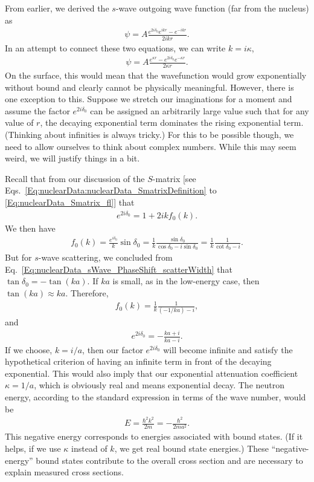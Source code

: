From earlier, we derived the $s$-wave outgoing wave function (far from the nucleus) as
\begin{align} 
  \psi = A \frac{ e^{2i\delta_0} e^{ikr} - e^{-ikr} }{2ikr}  . 
\end{align}
In an attempt to connect these two equations, we can write $k = i\kappa$,
\begin{align} 
  \psi = A \frac{ e^{\kappa r} - e^{2i\delta_0} e^{-\kappa r}  }{2\kappa r}  . 
\end{align}
On the surface, this would mean that the wavefunction would grow exponentially without bound and clearly cannot be physically meaningful. However, there is one exception to this. Suppose we stretch our imaginations for a moment and assume the factor $e^{2i\delta_0}$ can be assigned an arbitrarily large value such that for any value of $r$, the decaying exponential term dominates the rising exponential term. (Thinking about infinities is always tricky.) For this to be possible though, we need to allow ourselves to think about complex numbers. While this may seem weird, we will justify things in a bit.

Recall that from our discussion of the $S$-matrix [see Eqs.~\eqref{Eq:nuclearData:nuclearData_SmatrixDefinition} to \eqref{Eq:nuclearData_Smatrix_fl}] that
\begin{align}
  e^{2i\delta_0} = 1 + 2 i k f_0(k) . \nonumber
\end{align}
We then have
\begin{align}
  f_0(k) = \frac{e^{i\delta_0}}{k} \sin\delta_0 = \frac{1}{k} \frac{ \sin\delta_0 }{ \cos\delta_0 - i \sin\delta_0 } = \frac{1}{k} \frac{ 1 }{ \cot\delta_0 - i } . \nonumber
\end{align}
But for $s$-wave scattering, we concluded from Eq.~\eqref{Eq:nuclearData_sWave_PhaseShift_scatterWidth} that $\tan\delta_0 = -\tan(ka)$. If $ka$ is small, as in the low-energy case, then $\tan(ka) \approx ka$. Therefore,
\begin{align}
  f_0(k) = \frac{1}{k} \frac{ 1 }{ (-1/ka) - i } , \nonumber
\end{align}
and
\begin{align}
  e^{2i\delta_0} = -\frac{ka + i}{ka - i} . \nonumber
\end{align}
If we choose, $k = i/a$, then our factor $e^{2i\delta_0}$ will become infinite and satisfy the hypothetical criterion of having an infinite term in front of the decaying exponential. This would also imply that our exponential attenuation coefficient $\kappa = 1/a$, which is obviously real and means exponential decay. The neutron energy, according to the standard expression in terms of the wave number, would be
\begin{align}
  E = \frac{\hbar^2 k^2}{2m} = -\frac{\hbar^2}{2ma^2} .
\end{align}
This negative energy corresponds to energies associated with bound states. (If it helps, if we use $\kappa$ instead of $k$, we get real bound state energies.) These ``negative-energy'' bound states contribute to the overall cross section and are necessary to explain measured cross sections.

